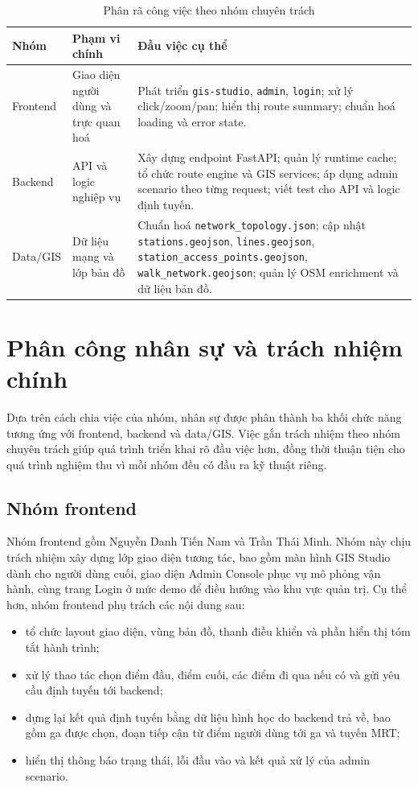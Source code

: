 \documentclass[../DoAn.tex]{subfiles}
\begin{document}
\begin{table}[H]
\centering
\small
\renewcommand{\arraystretch}{1.35}
\begin{tabular}{|>{\raggedright\arraybackslash}p{2.1cm}|>{\raggedright\arraybackslash}p{3.2cm}|>{\raggedright\arraybackslash}p{6.2cm}|}
\hline
\textbf{Nhóm} & \textbf{Phạm vi chính} & \textbf{Đầu việc cụ thể} \\
\hline
Frontend & Giao diện người dùng và trực quan hoá & Phát triển \texttt{gis-studio}, \texttt{admin}, \texttt{login};
xử lý click/zoom/pan; hiển thị route summary; chuẩn hoá loading và error state.
\\
\hline
Backend & API và logic nghiệp vụ & Xây dựng endpoint FastAPI; quản lý runtime cache;
tổ chức route engine và GIS services; áp dụng admin scenario theo từng request; viết test cho API và logic định tuyến.
\\
\hline
Data/GIS & Dữ liệu mạng và lớp bản đồ & Chuẩn hoá \texttt{network\_topology.json}; cập nhật \texttt{stations.geojson}, \texttt{lines.geojson}, \texttt{station\_access\_points.geojson}, \texttt{walk\_network.geojson};
quản lý OSM enrichment và dữ liệu bản đồ. \\
\hline
\end{tabular}
\caption{Phân rã công việc theo nhóm chuyên trách}
\label{tab:work-breakdown}
\end{table}

\section{Phân công nhân sự và trách nhiệm chính}
Dựa trên cách chia việc của nhóm, nhân sự được phân thành ba khối chức năng tương ứng với frontend, backend và data/GIS.
Việc gắn trách nhiệm theo nhóm chuyên trách giúp quá trình triển khai rõ đầu việc hơn, đồng thời thuận tiện cho quá trình nghiệm thu vì mỗi nhóm đều có đầu ra kỹ thuật riêng.

\subsection{Nhóm frontend}
Nhóm frontend gồm Nguyễn Danh Tiến Nam và Trần Thái Minh.
Nhóm này chịu trách nhiệm xây dựng lớp giao diện tương tác, bao gồm màn hình GIS Studio dành cho người dùng cuối, giao diện Admin Console phục vụ mô phỏng vận hành, cùng trang Login ở mức demo để điều hướng vào khu vực quản trị.
Cụ thể hơn, nhóm frontend phụ trách các nội dung sau:
\begin{itemize}
    \item tổ chức layout giao diện, vùng bản đồ, thanh điều khiển và phần hiển thị tóm tắt hành trình;
    \item xử lý thao tác chọn điểm đầu, điểm cuối, các điểm đi qua nếu có và gửi yêu cầu định tuyến tới backend;
    \item dựng lại kết quả định tuyến bằng dữ liệu hình học do backend trả về, bao gồm ga được chọn, đoạn tiếp cận từ điểm người dùng tới ga và tuyến MRT;
    \item hiển thị thông báo trạng thái, lỗi đầu vào và kết quả xử lý của admin scenario.
\end{itemize}
\end{document}
